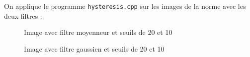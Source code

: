 \documentclass[french,a4paper,10pt]{article}
\begin{document}
    On applique le programme \texttt{hysteresis.cpp} sur les images de la norme avec les deux filtres : %

    \begin{figure}[!htb]
        \begin{minipage}{0.48\textwidth}
            \centering
            \caption{Image avec filtre moyenneur et seuils de 20 et 10}\label{Fig:hysteresis-20-10-gradient-filtre-moyenneur-peppers-grey}
        \end{minipage}\hfill
        \begin{minipage}{0.48\textwidth}
            \centering
            \caption{Image avec filtre gaussien et seuils de 20 et 10}\label{Fig:hysteresis-20-10-gradient-filtre-gaussien-peppers-grey}
        \end{minipage}
    \end{figure}
\end{document}
